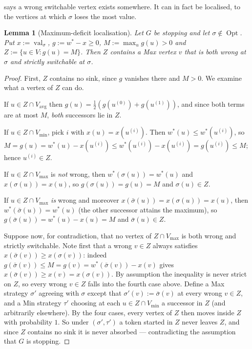 \documentclass[11pt]{article}
\theoremstyle{plain}
\newtheorem{lemma}[theorem]{Lemma}
\theoremstyle{definition}
\DeclareMathOperator{\val}{val}
\DeclareMathOperator{\Opt}{Opt}
\newcommand{\Vmax}{V_{\max}}
\newcommand{\Vmin}{V_{\min}}
\newcommand{\Vavg}{V_{\mathrm{avg}}}
\begin{document}
 says a wrong switchable vertex exists somewhere. It
can in fact be localised, to the vertices at which $\sigma$ loses the most
value.

\begin{lemma}[Maximum-deficit localisation]\label{lem:max-deficit}
Let $G$ be stopping and let $\sigma\notin\Opt$. Put $x:=\val_\sigma$,
$g:=w^\ast-x\ge0$, $M:=\max_u g(u)>0$ and $Z:=\{u\in V:g(u)=M\}$. Then
$Z$ contains a Max vertex $v$ that is both wrong at $\sigma$ and strictly
switchable at $\sigma$.
\end{lemma}

\begin{proof}
First, $Z$ contains no sink, since $g$ vanishes there and $M>0$. We
examine what a vertex of $Z$ can do.

If $u\in Z\cap\Vavg$ then $g(u)=\tfrac12(g(u^{(0)})+g(u^{(1)}))$, and
since both terms are at most $M$, \emph{both} successors lie in $Z$.

If $u\in Z\cap\Vmin$, pick $i$ with $x(u)=x(u^{(i)})$. Then
$w^\ast(u)\le w^\ast(u^{(i)})$, so
$M=g(u)=w^\ast(u)-x(u^{(i)})\le w^\ast(u^{(i)})-x(u^{(i)})=g(u^{(i)})\le M$;
hence $u^{(i)}\in Z$.

If $u\in Z\cap\Vmax$ is \emph{not} wrong, then $w^\ast(\sigma(u))=w^\ast(u)$
and $x(\sigma(u))=x(u)$, so $g(\sigma(u))=g(u)=M$ and $\sigma(u)\in Z$.

If $u\in Z\cap\Vmax$ \emph{is} wrong and moreover
$x(\bar\sigma(u))=x(\sigma(u))=x(u)$, then $w^\ast(\bar\sigma(u))=w^\ast(u)$
(the other successor attains the maximum), so
$g(\bar\sigma(u))=w^\ast(u)-x(u)=M$ and $\bar\sigma(u)\in Z$.

Suppose now, for contradiction, that no vertex of $Z\cap\Vmax$ is both
wrong and strictly switchable. Note first that a wrong $v\in Z$ always
satisfies $x(\bar\sigma(v))\ge x(\sigma(v))$: indeed
$g(\bar\sigma(v))\le M=g(v)=w^\ast(\bar\sigma(v))-x(v)$ gives
$x(\bar\sigma(v))\ge x(v)=x(\sigma(v))$. By assumption the inequality is
never strict on $Z$, so every wrong $v\in Z$ falls into the fourth case
above. Define a Max strategy $\sigma'$ agreeing with $\sigma$ except that
$\sigma'(v):=\bar\sigma(v)$ at every wrong $v\in Z$, and a Min strategy
$\tau'$ choosing at each $u\in Z\cap\Vmin$ a successor in $Z$ (and
arbitrarily elsewhere). By the four cases, every vertex of $Z$ then moves
inside $Z$ with probability $1$. So under $(\sigma',\tau')$ a token
started in $Z$ never leaves $Z$, and since $Z$ contains no sink it is
never absorbed --- contradicting the assumption that $G$ is stopping.
\end{proof}
\end{document}
